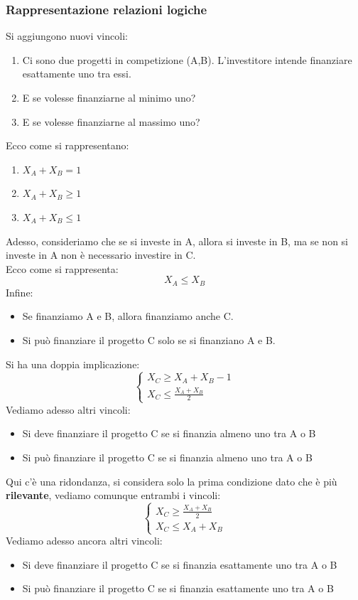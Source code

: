 \documentclass[12pt,a4paper]{article}
\begin{document}
\subsubsection{Rappresentazione relazioni logiche}
Si aggiungono nuovi vincoli:
\begin{enumerate}
    \item Ci sono due progetti in competizione (A,B). L'investitore intende finanziare esattamente uno tra essi.
    \item E se volesse finanziarne al minimo uno?
    \item E se volesse finanziarne al massimo uno?
\end{enumerate}
Ecco come si rappresentano:
\begin{enumerate}
    \item $X_A + X_B = 1$
    \item $X_A + X_B \geq 1$
    \item $X_A + X_B \leq 1$
\end{enumerate}
Adesso, consideriamo che se si investe in A, allora si investe in B, ma se non si investe in A non è necessario investire in C.\\
Ecco come si rappresenta:
\[
X_A \leq X_B
\]
Infine:
\begin{itemize}
    \item Se finanziamo A e B, allora finanziamo anche C.
    \item Si può finanziare il progetto C solo se si finanziano A e B.
\end{itemize}
Si ha una doppia implicazione:
\[
\begin{cases}
    X_C \geq X_A + X_B - 1\\
    X_C \leq \frac{X_A + X_B}{2}
\end{cases}
\]
Vediamo adesso altri vincoli:
\begin{itemize}
    \item Si deve finanziare il progetto C se si finanzia almeno uno tra A o B
    \item Si può finanziare il progetto C se si finanzia almeno uno tra A o B
\end{itemize}
Qui c'è una ridondanza, si considera solo la prima condizione dato che è più \textbf{rilevante}, vediamo comunque entrambi i vincoli:
\[
\begin{cases}
    X_C \geq \frac{X_A + X_B}{2}\\
    X_C \leq X_A + X_B
\end{cases}
\]
Vediamo adesso ancora altri vincoli:
\begin{itemize}
    \item Si deve finanziare il progetto C se si finanzia esattamente uno tra A o B
    \item Si può finanziare il progetto C se si finanzia esattamente uno tra A o B
\end{itemize}
\end{document}
